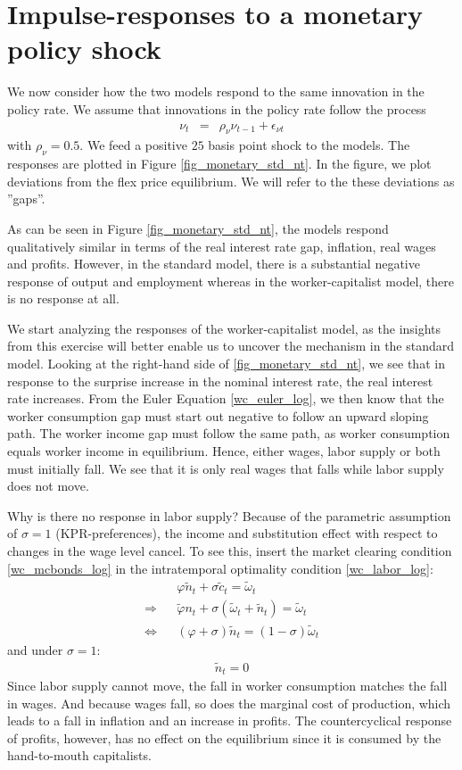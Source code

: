 \section{Impulse-responses to a monetary policy shock}
\label{sec:results}
We now consider how the two models respond to the same innovation in the policy rate. We assume that innovations in the policy rate follow the process
\begin{eqnarray}
\nu_t &=& \rho_{\nu} \nu_{t-1}+\epsilon_{\nu t} \nonumber
\end{eqnarray}
with $\rho_{\nu}=0.5$. We feed a positive $25$ basis point shock to the models. The responses are plotted in Figure \ref{fig_monetary_std_nt}. In the figure, we plot deviations from the flex price equilibrium. We will refer to the these deviations as ''gaps''.

As can be seen in Figure \ref{fig_monetary_std_nt}, the models respond qualitatively similar in terms of the real interest rate gap, inflation, real wages and profits. However, in the standard model, there is a substantial negative response of output and employment whereas in the worker-capitalist model, there is no response at all.

We start analyzing the responses of the worker-capitalist model, as the insights from this exercise will better enable us to uncover the mechanism in the standard model. Looking at the right-hand side of \ref{fig_monetary_std_nt}, we see that in response to the surprise increase in the nominal interest rate, the real interest rate increases. From the Euler Equation \eqref{wc_euler_log}, we then know that the worker consumption gap must start out negative to follow an upward sloping path. The worker income gap must follow the same path, as worker consumption equals worker income in equilibrium. Hence, either wages, labor supply or both must initially fall. We see that it is only real wages that falls while labor supply does not move. 

Why is there no response in labor supply? Because of the parametric assumption of $\sigma=1$ (KPR-preferences), the income and substitution effect with respect to changes in the wage level cancel. To see this, insert the market clearing condition \eqref{wc_mcbonds_log} in the intratemporal optimality condition \eqref{wc_labor_log}:
\begin{eqnarray}
&& \varphi  \tilde n_t + \sigma  \tilde c_t =  \tilde \omega_t \nonumber \\
\Rightarrow  && \tilde \varphi n_t + \sigma ( \tilde \omega_t+ \tilde n_t) =  \tilde \omega_t \nonumber \\
\Leftrightarrow && (\varphi+\sigma)  \tilde n_t = (1-\sigma) \tilde \omega_t \nonumber
\end{eqnarray} 
and under $\sigma=1$:
\begin{eqnarray}
\tilde n_t = 0 \nonumber
\end{eqnarray}
Since labor supply cannot move, the fall in worker consumption matches the fall in wages. And because wages fall, so does the marginal cost of production, which leads to a fall in inflation and an increase in profits. The countercyclical response of profits, however, has no effect on the equilibrium since it is consumed by the hand-to-mouth capitalists.

